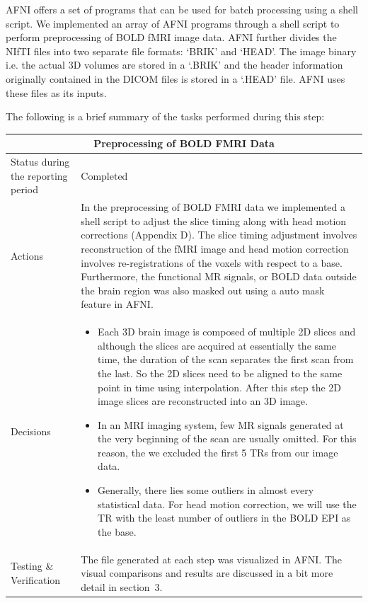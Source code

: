 \documentclass[12pt]{article}
\begin{document}
AFNI offers a set of programs that can be used for batch processing
using a shell script. We implemented an array of AFNI programs through
a shell script to perform preprocessing of BOLD fMRI image data. AFNI
further divides the NIfTI files into two separate file formats: `BRIK'
and `HEAD'. The image binary i.e. the actual 3D volumes are stored in
a `.BRIK' and the header information originally contained in the DICOM
files is stored in a `.HEAD' file.  AFNI uses these files as its
inputs.

\newpage
The following is a brief summary of the tasks performed during this
step:

\begin{table}[H]
  \centering
  \begin{tabular} {| m{3.3cm} | m{11.5cm} | }
    \hline
    \multicolumn{2}{|c|}{Preprocessing of BOLD FMRI Data} \\ \hline
    Status during the reporting period & Completed    \\ \hline
    Actions &
    In the preprocessing of BOLD FMRI data we implemented a shell
    script to adjust the slice timing along with head motion
    corrections (Appendix D). The slice timing adjustment involves
    reconstruction of the fMRI image and head motion correction
    involves re-registrations of the voxels with respect to a base.
    Furthermore, the functional MR signals, or BOLD data outside the
    brain region was also masked out using a auto mask feature in
    AFNI.  \\ \hline

    Decisions &
    \begin{itemize}

      \item Each 3D brain image is composed of multiple 2D slices and
        although the slices are acquired at essentially the same time,
        the duration of the scan separates the first scan from the
        last. So the 2D slices need to be aligned to the same point in
        time using interpolation. After this step the 2D image slices
        are reconstructed into an 3D image.

      \item In an MRI imaging system, few MR signals generated
        at the very beginning of the scan are usually omitted. For
        this reason, the we excluded the first 5 TRs from our image
        data.

      \item Generally, there lies some outliers in almost every
        statistical data. For head motion correction, we will use the
        TR with the least number of outliers in the BOLD EPI as the
        base.

    \end{itemize} \\ \hline

    Testing \& Verification &
    The file generated at each step was visualized in AFNI. The
    visual comparisons and results are discussed in a bit more detail
    in section~3. \\ \hline

  \end{tabular}
\end{table}
\end{document}
